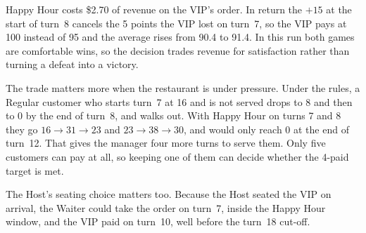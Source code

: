 Happy Hour costs \$2.70 of revenue on the VIP's order. In return the $+15$ at the start of turn~8 cancels the 5 points the VIP lost on turn~7, so the VIP pays at 100 instead of 95 and the average rises from 90.4 to 91.4. In this run both games are comfortable wins, so the decision trades revenue for satisfaction rather than turning a defeat into a victory.

The trade matters more when the restaurant is under pressure. Under the rules, a Regular customer who starts turn~7 at 16 and is not served drops to 8 and then to 0 by the end of turn~8, and walks out. With Happy Hour on turns 7 and 8 they go $16 \to 31 \to 23$ and $23 \to 38 \to 30$, and would only reach 0 at the end of turn~12. That gives the manager four more turns to serve them. Only five customers can pay at all, so keeping one of them can decide whether the 4-paid target is met.

The Host's seating choice matters too. Because the Host seated the VIP on arrival, the Waiter could take the order on turn~7, inside the Happy Hour window, and the VIP paid on turn~10, well before the turn~18 cut-off.
